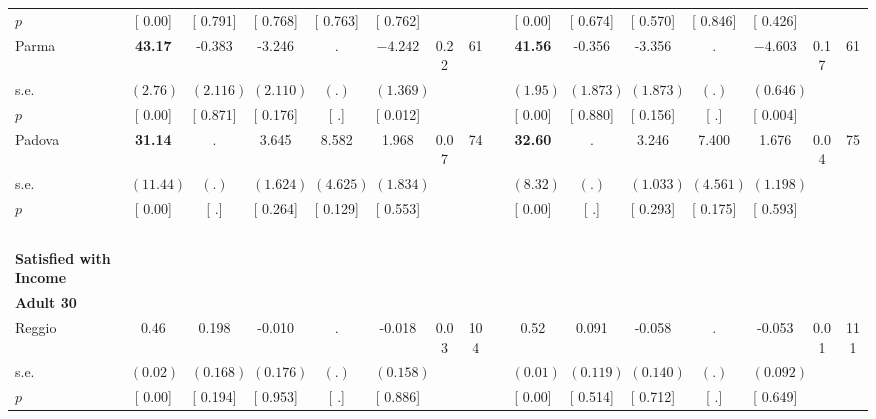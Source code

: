 \begin{longtable}{L{8em} c c c c c c c p{1em} c c c c c c c}
\quad \quad \quad \quad $ p$ & [     0.00] & [    0.791] & [    0.768] & [    0.763] & [    0.762] & & & & [     0.00] & [    0.674] & [    0.570] & [    0.846] & [    0.426] & &  \\[1em]
\quad \quad \quad Parma& \textbf{    43.17} &    -0.383 &    -3.246 &         . & $ \mathbf{   -4.242}$ &      0.22 &        61 & & \textbf{    41.56} &    -0.356 &    -3.356 &         . & $ \mathbf{   -4.603}$ &      0.17 &        61  \\*
\quad \quad \quad \quad s.e.& $ (     2.76)$ & $ (    2.116)$ & $ (    2.110)$ & $ (        .)$ & $ (    1.369)$ & & & & $ (     1.95)$ & $ (    1.873)$ & $ (    1.873)$ & $ (        .)$ & $ (    0.646)$ & &  \\*
\quad \quad \quad \quad $ p$ & [     0.00] & [    0.871] & [    0.176] & [        .] & [    0.012] & & & & [     0.00] & [    0.880] & [    0.156] & [        .] & [    0.004] & &  \\[1em]
\quad \quad \quad Padova& \textbf{    31.14} &         . &     3.645 &     8.582 &     1.968 &      0.07 &        74 & & \textbf{    32.60} &         . &     3.246 &     7.400 &     1.676 &      0.04 &        75  \\*
\quad \quad \quad \quad s.e.& $ (    11.44)$ & $ (        .)$ & $ (    1.624)$ & $ (    4.625)$ & $ (    1.834)$ & & & & $ (     8.32)$ & $ (        .)$ & $ (    1.033)$ & $ (    4.561)$ & $ (    1.198)$ & &  \\*
\quad \quad \quad \quad $ p$ & [     0.00] & [        .] & [    0.264] & [    0.129] & [    0.553] & & & & [     0.00] & [        .] & [    0.293] & [    0.175] & [    0.593] & &  \\[1em]
~\\[1em]
\textbf{Satisfied with Income} \\*
\quad \quad \textbf{Adult 30} & & & & & & & & & & & & & & & \\* 
\quad \quad \quad Reggio& 0.46 &     0.198 &    -0.010 &         . &    -0.018 &      0.03 &       104 & & 0.52 &     0.091 &    -0.058 &         . &    -0.053 &      0.01 &       111  \\*
\quad \quad \quad \quad s.e.& $ (     0.02)$ & $ (    0.168)$ & $ (    0.176)$ & $ (        .)$ & $ (    0.158)$ & & & & $ (     0.01)$ & $ (    0.119)$ & $ (    0.140)$ & $ (        .)$ & $ (    0.092)$ & &  \\*
\quad \quad \quad \quad $ p$ & [     0.00] & [    0.194] & [    0.953] & [        .] & [    0.886] & & & & [     0.00] & [    0.514] & [    0.712] & [        .] & [    0.649] & &  \\[1em]

\end{longtable}
